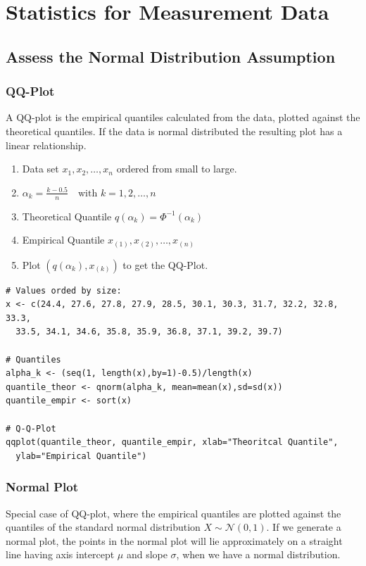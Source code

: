 \documentclass[11pt]{article}
\begin{document}
\newpage
\section{Statistics for Measurement Data}

\subsection{Assess the Normal Distribution Assumption}
\subsubsection{QQ-Plot}

A QQ-plot is the empirical quantiles calculated from the data, plotted against the theoretical quantiles. If the data is normal distributed the resulting plot has a linear relationship.

\begin{enumerate}[label=(\arabic*)]
	\item Data set $x_1,x_2,\dots, x_n$ ordered from small to large.
	\item $\alpha_k = \frac{k-0.5}{n}\quad \text{with } k=1,2,\dots,n$
	\item Theoretical Quantile $q(\alpha_k) = \Phi^{-1}(\alpha_k)$
	\item Empirical Quantile $x_{(1)}, x_{(2)},\dots, x_{(n)}$
	\item Plot $\left( q(\alpha_k), x_{(k)} \right)$ to get the QQ-Plot.
\end{enumerate}

\begin{verbatim}
# Values orded by size:
x <- c(24.4, 27.6, 27.8, 27.9, 28.5, 30.1, 30.3, 31.7, 32.2, 32.8, 33.3, 
  33.5, 34.1, 34.6, 35.8, 35.9, 36.8, 37.1, 39.2, 39.7)

# Quantiles
alpha_k <- (seq(1, length(x),by=1)-0.5)/length(x)
quantile_theor <- qnorm(alpha_k, mean=mean(x),sd=sd(x))
quantile_empir <- sort(x)

# Q-Q-Plot
qqplot(quantile_theor, quantile_empir, xlab="Theoritcal Quantile",
  ylab="Empirical Quantile")
\end{verbatim}

\subsubsection{Normal Plot}
Special case of QQ-plot, where the empirical quantiles are plotted against the quantiles of the standard normal distribution $X \sim \mathcal{N}\left(0, 1\right)$. If we generate a normal plot, the points in the normal plot will lie approximately on a straight line having axis intercept $\mu$ and slope $\sigma$, when we have a normal distribution.
\end{document}
